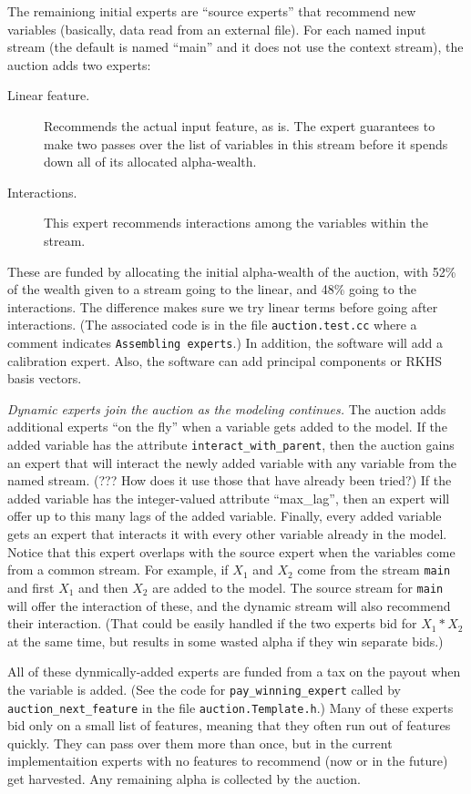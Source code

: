 \documentclass[12pt]{article}
\begin{document}
 The remainiong initial experts are ``source experts'' that recommend new
 variables (basically, data read from an external file).  For each named input
 stream (the default is named ``main'' and it does not use the context stream),
 the auction adds two experts:
 \begin{description}
  \item[Linear feature.] Recommends the actual input feature, as is.  The expert
 guarantees to make two passes over the list of variables in this stream before
 it spends down all of its allocated alpha-wealth.
  \item[Interactions.]  This expert recommends interactions among the variables
 within the stream. 
 \end{description}
 These are funded by allocating the initial alpha-wealth of the auction, with
 52\% of the wealth given to a stream going to the linear, and 48\% going to the
 interactions.  The difference makes sure we try linear terms before going after
 interactions.  (The associated code is in the file {\tt auction.test.cc} where
 a comment indicates {\tt Assembling experts}.)  In addition, the software will
 add a calibration expert.  Also, the software can add principal components or
 RKHS basis vectors.

 {\em Dynamic experts join the auction as the modeling continues.}  The auction
 adds additional experts ``on the fly'' when a variable gets added to the model.
  If the added variable has the attribute {\tt interact\_with\_parent}, then the
 auction gains an expert that will interact the newly added variable with any
 variable from the named stream. (??? How does it use those that have already
 been tried?)  If the added variable has the integer-valued attribute
 ``max\_lag'', then an expert will offer up to this many lags of the added
 variable.  Finally, every added variable gets an expert that interacts it with
 every other variable already in the model.  Notice that this expert overlaps
 with the source expert when the variables come from a common stream.  For
 example, if $X_1$ and $X_2$ come from the stream {\tt main} and first $X_1$ and
 then $X_2$ are added to the model. The source stream for {\tt main} will offer
 the interaction of these, and the dynamic stream will also recommend their
 interaction.  (That could be easily handled if the two experts bid for $X_1 *
 X_2$ at the same time, but results in some wasted alpha if they win separate
 bids.)

 All of these dynmically-added experts are funded from a tax on the payout when
 the variable is added.  (See the code for {\tt pay\_winning\_expert} called by
 {\tt auction\_next\_feature} in the file {\tt auction.Template.h}.)  Many of
 these experts bid only on a small list of features, meaning that they often run
 out of features quickly.  They can pass over them more than once, but in the
 current implementaition experts with no features to recommend (now or in the
 future) get harvested.  Any remaining alpha is collected by the auction.
\end{document}
